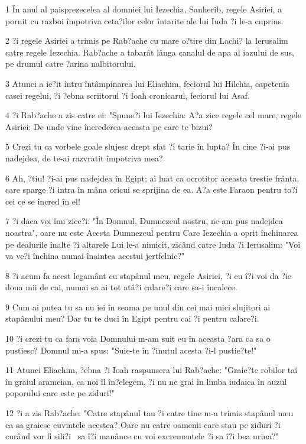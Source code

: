 \par 1 În anul al paisprezecelea al domniei lui Iezechia, Sanherib, regele Asiriei, a pornit cu razboi împotriva ceta?ilor celor întarite ale lui Iuda ?i le-a cuprins.
\par 2 ?i regele Asiriei a trimis pe Rab?ache cu mare o?tire din Lachi? la Ierusalim catre regele Iezechia. Rab?ache a tabarât lânga canalul de apa al iazului de sus, pe drumul catre ?arina nalbitorului.
\par 3 Atunci a ie?it întru întâmpinarea lui Eliachim, feciorul lui Hilchia, capetenia casei regelui, ?i ?ebna scriitorul ?i Ioah cronicarul, feciorul lui Asaf.
\par 4 ?i Rab?ache a zis catre ei: "Spune?i lui Iezechia: A?a zice regele cel mare, regele Asiriei: De unde vine încrederea aceasta pe care te bizui?
\par 5 Crezi tu ca vorbele goale slujesc drept sfat ?i tarie în lupta? În cine ?i-ai pus nadejdea, de te-ai razvratit împotriva mea?
\par 6 Ah, ?tiu! ?i-ai pus nadejdea în Egipt; ai luat ca ocrotitor aceasta trestie frânta, care sparge ?i intra în mâna oricui se sprijina de ea. A?a este Faraon pentru to?i cei ce se încred în el!
\par 7 ?i daca voi îmi zice?i: "În Domnul, Dumnezeul nostru, ne-am pus nadejdea noastra", oare nu este Acesta Dumnezeul pentru Care Iezechia a oprit închinarea pe dealurile înalte ?i altarele Lui le-a nimicit, zicând catre Iuda ?i Ierusalim: "Voi va ve?i închina numai înaintea acestui jertfelnic?"
\par 8 ?i acum fa acest legamânt cu stapânul meu, regele Asiriei, ?i eu î?i voi da ?ie doua mii de cai, numai sa ai tot atâ?i calare?i care sa-i încalece.
\par 9 Cum ai putea tu sa nu iei în seama pe unul din cei mai mici slujitori ai stapânului meu? Dar tu te duci în Egipt pentru cai ?i pentru calare?i.
\par 10 ?i crezi tu ca fara voia Domnului m-am suit eu în aceasta ?ara ca sa o pustiesc? Domnul mi-a spus: "Suie-te în ?inutul acesta ?i-l pustie?te!"
\par 11 Atunci Eliachim, ?ebna ?i Ioah raspunsera lui Rab?ache: "Graie?te robilor tai în graiul arameian, ca noi îl în?elegem, ?i nu ne grai în limba iudaica în auzul poporului care este pe ziduri!"
\par 12 ?i a zis Rab?ache: "Catre stapânul tau ?i catre tine m-a trimis stapânul meu ca sa graiesc cuvintele acestea? Oare nu catre oamenii care stau pe ziduri ?i curând vor fi sili?i  sa î?i manânce cu voi excrementele ?i sa î?i bea urina?"

